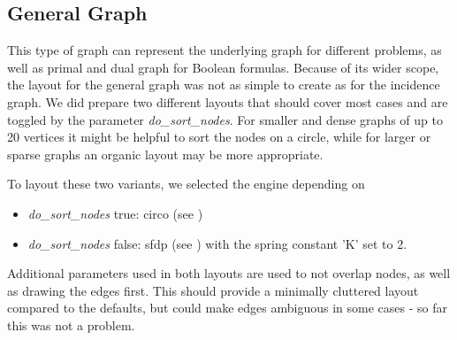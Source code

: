 \documentclass[a4paper, 12pt, bibliography=totoc]{scrartcl}
\begin{document}


\subsection{General Graph}
This type of graph can represent the underlying graph for different problems, as well as primal and dual graph for Boolean formulas.
Because of its wider scope, the layout for the general graph was not as simple to create as for the incidence graph.
We did prepare two different layouts that should cover most cases and are toggled by the parameter \textit{do\_sort\_nodes}.
For smaller and dense graphs of up to 20 vertices it might be helpful to sort the nodes on a circle, while for larger or sparse graphs an organic layout may be more appropriate.

To layout these two variants, we selected the engine depending on
\begin{itemize}
	\item \textit{do\_sort\_nodes} true: circo (see \cite{ST99})
	\item \textit{do\_sort\_nodes} false: sfdp (see \cite{Hu05}) with the spring constant 'K' set to 2.
\end{itemize}

Additional parameters used in both layouts are used to not overlap nodes, as well as drawing the edges first. This should provide a minimally cluttered layout compared to the defaults, but could make edges ambiguous in some cases - so far this was not a problem.
%
\end{document}
